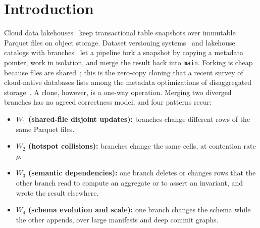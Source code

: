 \documentclass[sigconf, nonacm]{acmart}
\begin{document}
\section{Introduction}
\label{sec:intro}

Cloud data lakehouses~\cite{armbrust2020delta, zaharia2021lakehouse, jain2023analyzing, harby2025survey} keep transactional table snapshots over immutable Parquet files on object storage. Dataset versioning systems~\cite{bhattacherjee2015principles, bhardwaj2015datahub, maddox2016decibel, huang2017orpheusdb, wang2018forkbase} and lakehouse catalogs with branches~\cite{tagliabue2024bauplan, icebergbranching, nessie, lakefs, deltaclone} let a pipeline fork a snapshot by copying a metadata pointer, work in isolation, and merge the result back into \texttt{main}. Forking is cheap because files are shared~\cite{bhattacherjee2015principles}; this is the zero-copy cloning that a recent survey of cloud-native databases lists among the metadata optimizations of disaggregated storage~\cite{dong2024cloudnative}. A clone, however, is a one-way operation. Merging two diverged branches has no agreed correctness model, and four patterns recur:
\begin{itemize}[leftmargin=8pt, itemsep=0pt, topsep=1pt]
    \item \textbf{$W_1$ (shared-file disjoint updates):} branches change different rows of the same Parquet files.
    \item \textbf{$W_2$ (hotspot collisions):} branches change the same cells, at contention rate $\rho$.
    \item \textbf{$W_3$ (semantic dependencies):} one branch deletes or changes rows that the other branch read to compute an aggregate or to assert an invariant, and wrote the result elsewhere.
    \item \textbf{$W_4$ (schema evolution and scale):} one branch changes the schema while the other appends, over large manifests and deep commit graphs.
\end{itemize}
\end{document}
